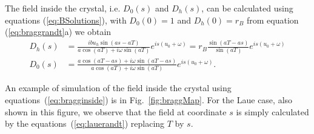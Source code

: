 \documentclass[preprint]{iucr}              %
\begin{document}
The field inside the crystal, i.e. $D_0(s)$ and $D_h(s)$, can be calculated using equations (\ref{eq:BSolutions}), with $D_0(0)=1$ and $D_h(0)=r_B$ from equation (\ref{eq:braggrandt}a) we obtain
\begin{subequations}\label{eq:bragginside}
\begin{align}
D_h(s)&=\frac{i b u_h \sin(as - aT)}{a \cos(aT) + i \omega \sin(aT)} e^{is(u_0+\omega)} 
= r_B \frac{\sin(aT - as)}{\sin(aT)} e^{is(u_0+\omega)}\\
D_0(s)&= \frac{a \cos(aT-as) + i \omega \sin(aT-as)}{a \cos(aT) + i \omega \sin(aT)} e^{is(u_0+\omega)}.
\end{align}
\end{subequations}

An example of simulation of the field inside the crystal using equations~(\ref{eq:bragginside}) is in Fig.~\ref{fig:braggMap}. For the Laue case, also shown in this figure, we observe that the field at coordinate $s$ is simply calculated by the equations~(\ref{eq:lauerandt}) replacing $T$ by $s$.
\end{document}
